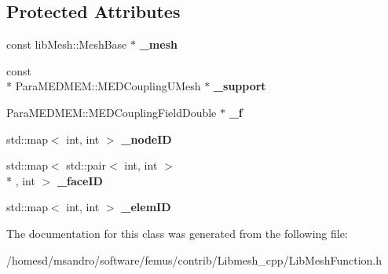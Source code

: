 \subsection*{Protected Attributes}
\begin{DoxyCompactItemize}
\item 
\hypertarget{class_lib_mesh_function_ad39808f78a545b8b838318402d25cb14}{const lib\-Mesh\-::\-Mesh\-Base $\ast$ {\bfseries \-\_\-mesh}}\label{class_lib_mesh_function_ad39808f78a545b8b838318402d25cb14}

\item 
\hypertarget{class_lib_mesh_function_a74d20b871fdfae3e2b159f7a757fbccd}{const \\*
Para\-M\-E\-D\-M\-E\-M\-::\-M\-E\-D\-Coupling\-U\-Mesh $\ast$ {\bfseries \-\_\-support}}\label{class_lib_mesh_function_a74d20b871fdfae3e2b159f7a757fbccd}

\item 
\hypertarget{class_lib_mesh_function_a1102eeaea5166fa6e5db44e708ee9aa5}{Para\-M\-E\-D\-M\-E\-M\-::\-M\-E\-D\-Coupling\-Field\-Double $\ast$ {\bfseries \-\_\-f}}\label{class_lib_mesh_function_a1102eeaea5166fa6e5db44e708ee9aa5}

\item 
\hypertarget{class_lib_mesh_function_ab387e7ad966a62774124231d3206aaa9}{std\-::map$<$ int, int $>$ {\bfseries \-\_\-node\-I\-D}}\label{class_lib_mesh_function_ab387e7ad966a62774124231d3206aaa9}

\item 
\hypertarget{class_lib_mesh_function_a900c549c6c4d0e62ddb974b0cf0d380f}{std\-::map$<$ std\-::pair$<$ int, int $>$\\*
, int $>$ {\bfseries \-\_\-face\-I\-D}}\label{class_lib_mesh_function_a900c549c6c4d0e62ddb974b0cf0d380f}

\item 
\hypertarget{class_lib_mesh_function_aeafaef87a7a08e730d65712efb0ceb54}{std\-::map$<$ int, int $>$ {\bfseries \-\_\-elem\-I\-D}}\label{class_lib_mesh_function_aeafaef87a7a08e730d65712efb0ceb54}

\end{DoxyCompactItemize}


The documentation for this class was generated from the following file\-:\begin{DoxyCompactItemize}
\item 
/homesd/msandro/software/femus/contrib/\-Libmesh\-\_\-cpp/Lib\-Mesh\-Function.\-h\end{DoxyCompactItemize}
